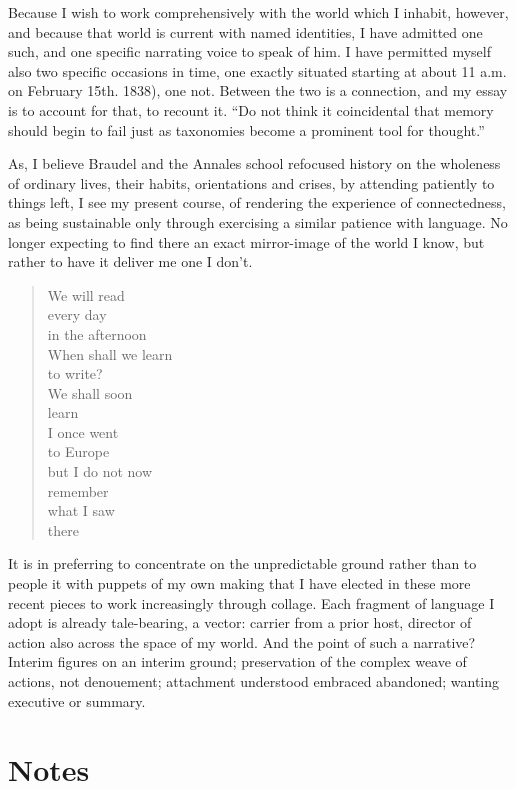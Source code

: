 \documentclass[
]{memoir}
\begin{document}
Because I wish to work comprehensively with the world which I inhabit,
however, and because that world is current with named identities, I have
admitted one such, and one specific narrating voice to speak of him. I
have permitted myself also two specific occasions in time, one exactly
situated starting at about 11 a.m. on February 15th. 1838), one not.
Between the two is a connection, and my essay is to account for that, to
recount it. ``Do not think it coincidental that memory should begin to
fail just as taxonomies become a prominent tool for thought.''

As, I believe Braudel and the Annales school refocused history on the
wholeness of ordinary lives, their habits, orientations and crises, by
attending patiently to things left, I see my present course, of
rendering the experience of connectedness, as being sustainable only
through exercising a similar patience with language. No longer expecting
to find there an exact mirror-image of the world I know, but rather to
have it deliver me one I don't.

\begin{verse}
We will read\\
every day\\
in the afternoon\\
When shall we learn\\
to write?\\
We shall soon\\
learn\\
I once went\\
to Europe\\
but I do not now\\
remember\\
what I saw\\
there\\
\end{verse}

It is in preferring to concentrate on the unpredictable ground rather
than to people it with puppets of my own making that I have elected in
these more recent pieces to work increasingly through collage. Each
fragment of language I adopt is already tale-bearing, a vector: carrier
from a prior host, director of action also across the space of my world.
And the point of such a narrative? Interim figures on an interim ground;
preservation of the complex weave of actions, not denouement; attachment
understood embraced abandoned; wanting executive or summary.

\hypertarget{notes}{%
\section*{Notes}\label{notes}}
\end{document}
